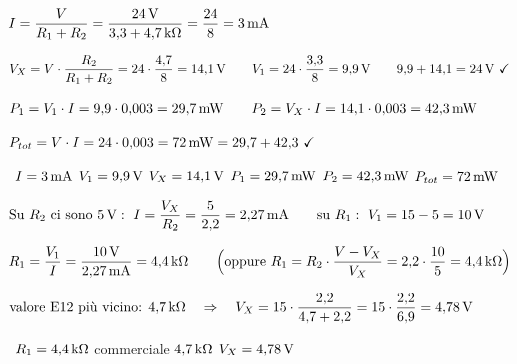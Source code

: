

\newcommand{\pas}[1]{\par\hspace*{4mm}$\displaystyle #1$\par}
\newcommand{\ris}[1]{\par\vspace{1mm}\hspace*{4mm}\colorbox{grigio}{\strut\ #1\ }\par}






\pas{I = \frac{V}{R_1 + R_2} = \frac{24\U{V}}{3{,}3 + 4{,}7\U{k\Omega}} = \frac{24}{8} = 3\U{mA}}
\pas{V_X = V \cdot \frac{R_2}{R_1 + R_2} = 24 \cdot \frac{4{,}7}{8} = 14{,}1\U{V} \qquad V_1 = 24 \cdot \frac{3{,}3}{8} = 9{,}9\U{V} \qquad 9{,}9 + 14{,}1 = 24\U{V}\ \checkmark}
\pas{P_1 = V_1 \cdot I = 9{,}9 \cdot 0{,}003 = 29{,}7\U{mW} \qquad P_2 = V_X \cdot I = 14{,}1 \cdot 0{,}003 = 42{,}3\U{mW}}
\pas{P_{tot} = V \cdot I = 24 \cdot 0{,}003 = 72\U{mW} = 29{,}7 + 42{,}3\ \checkmark}
\ris{$I = 3\,\mathrm{mA}$ \quad $V_1 = 9{,}9\,\mathrm{V}$ \quad $V_X = 14{,}1\,\mathrm{V}$ \quad $P_1 = 29{,}7\,\mathrm{mW}$ \quad $P_2 = 42{,}3\,\mathrm{mW}$ \quad $P_{tot} = 72\,\mathrm{mW}$}

\pas{\text{Su } R_2 \text{ ci sono } 5\U{V}: \ I = \frac{V_X}{R_2} = \frac{5}{2{,}2} = 2{,}27\U{mA} \qquad \text{su } R_1: \ V_1 = 15 - 5 = 10\U{V}}
\pas{R_1 = \frac{V_1}{I} = \frac{10\U{V}}{2{,}27\U{mA}} = 4{,}4\U{k\Omega} \qquad \Big(\text{oppure } R_1 = R_2 \cdot \frac{V - V_X}{V_X} = 2{,}2 \cdot \frac{10}{5} = 4{,}4\U{k\Omega}\Big)}
\pas{\text{valore E12 più vicino: } 4{,}7\U{k\Omega} \quad\Rightarrow\quad V_X = 15 \cdot \frac{2{,}2}{4{,}7 + 2{,}2} = 15 \cdot \frac{2{,}2}{6{,}9} = 4{,}78\U{V}}
\ris{$R_1 = 4{,}4\,\mathrm{k\Omega}$ \quad commerciale $4{,}7\,\mathrm{k\Omega}$ \quad $V_X = 4{,}78\,\mathrm{V}$}

